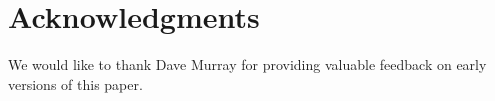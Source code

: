 \section{Acknowledgments} 

We would like to thank Dave Murray for providing valuable feedback on
early versions of this paper.
